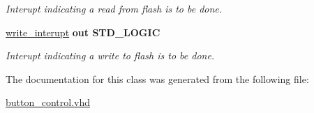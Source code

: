 \begin{DoxyCompactItemize}
\begin{DoxyCompactList}\small\item\em Interupt indicating a read from flash is to be done. \end{DoxyCompactList}\item 
\hypertarget{classbutton__control_a976537540918c28b4b20479c41d03ac8}{\hyperlink{classbutton__control_a976537540918c28b4b20479c41d03ac8}{write\-\_\-interupt}  {\bfseries {\bfseries \textcolor{vhdlkeyword}{out}\textcolor{vhdlchar}{ }}} {\bfseries \textcolor{comment}{S\-T\-D\-\_\-\-L\-O\-G\-I\-C}\textcolor{vhdlchar}{ }} }\label{classbutton__control_a976537540918c28b4b20479c41d03ac8}

\begin{DoxyCompactList}\small\item\em Interupt indicating a write to flash is to be done. \end{DoxyCompactList}\end{DoxyCompactItemize}


The documentation for this class was generated from the following file\-:\begin{DoxyCompactItemize}
\item 
\hyperlink{button__control_8vhd}{button\-\_\-control.\-vhd}\end{DoxyCompactItemize}
